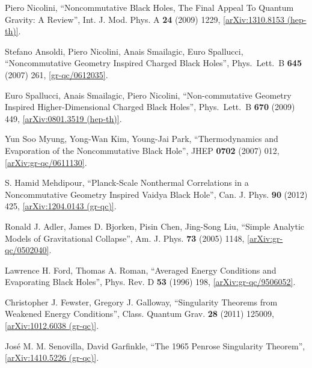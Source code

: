 \documentclass[12pt]{article}
\newcommand{\2}{$^2$}
\newcommand{\3}{$^3$}
\newcommand{\4}{$_4$}
\newcommand{\5}{$_5$}
\begin{document}
\begin{thebibliography}{400}
	Piero Nicolini, ``Noncommutative Black Holes, The Final Appeal To Quantum Gravity: A Review'', Int. J. Mod. Phys. A \textbf{24} (2009) 1229, \href{http://arxiv.org/abs/arXiv:1310.8153}{[arXiv:1310.8153 (hep-th)]}.
	
  Stefano Ansoldi, Piero Nicolini, Anais Smailagic, Euro Spallucci,
  ``Noncommutative Geometry Inspired Charged Black Holes'', 
  Phys.\ Lett.\ B {\bf 645} (2007) 261, \href{http://arxiv.org/abs/gr-qc/0612035}{[gr-qc/0612035]}.

 Euro Spallucci, Anais Smailagic, Piero Nicolini,
  ``Non-commutative Geometry Inspired Higher-Dimensional Charged Black Holes'',
  Phys.\ Lett.\ B {\bf 670} (2009) 449,  \href{http://arxiv.org/abs/0801.3519}{[arXiv:0801.3519 (hep-th)]}.

	Yun Soo Myung, Yong-Wan Kim, Young-Jai Park, ``Thermodynamics and Evaporation of the Noncommutative Black Hole'', JHEP \textbf{0702} (2007) 012, \href{http://arxiv.org/abs/gr-qc/0611130}{[arXiv:gr-qc/0611130]}.


	
	S. Hamid Mehdipour, ``Planck-Scale Nonthermal Correlations in a Noncommutative Geometry Inspired Vaidya Black Hole'',  	Can. J. Phys. \textbf{90} (2012) 425, \href{http://arxiv.org/abs/1204.0143}{[arXiv:1204.0143 (gr-qc)]}.
	
Ronald J. Adler, James D. Bjorken, Pisin Chen, Jing-Song Liu, ``Simple Analytic Models of Gravitational Collapse'', 
Am. J. Phys. \textbf{73} (2005) 1148, \href{http://arxiv.org/abs/gr-qc/0502040}{[arXiv:gr-qc/0502040]}.

Lawrence H. Ford, Thomas A. Roman, ``Averaged Energy Conditions and Evaporating Black Holes'', Phys. Rev. D \textbf{53} (1996) 198, \href{http://arxiv.org/abs/gr-qc/9506052v2}{[arXiv:gr-qc/9506052]}.

Christopher J. Fewster, Gregory J. Galloway, ``Singularity Theorems from Weakened Energy Conditions'', 	Class. Quantum Grav. \textbf{28} (2011) 125009, \href{http://arxiv.org/abs/1012.6038v3}{[arXiv:1012.6038 (gr-qc)]}.


Jos\'e M. M. Senovilla, David Garfinkle, ``The 1965 Penrose Singularity Theorem'', \href{http://arxiv.org/abs/1410.5226}{[arXiv:1410.5226 (gr-qc)]}.


\end{thebibliography}
\end{document}
